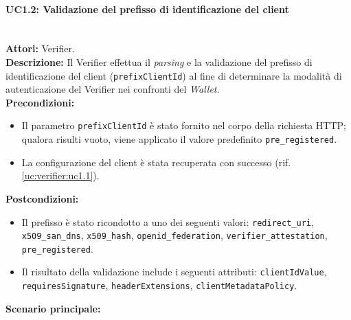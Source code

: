 \paragraph{\large\bfseries UC1.2: Validazione del prefisso di identificazione del client}
\label{uc:verifier:uc1.2}
\mbox{}\\
\noindent\textbf{Attori:} Verifier.
\\
\noindent\textbf{Descrizione:} Il Verifier effettua il \textit{parsing} e la validazione del prefisso di identificazione del client (\texttt{prefixClientId}) al fine di determinare la modalità di autenticazione del Verifier nei confronti del \textit{Wallet}.
\\
\noindent\textbf{Precondizioni:}
\begin{itemize}
    \item Il parametro \texttt{prefixClientId} è stato fornito nel corpo della richiesta HTTP; qualora risulti vuoto, viene applicato il valore predefinito \texttt{pre\_\allowbreak{}registered}.
    \item La configurazione del client è stata recuperata con successo (rif. \ref{uc:verifier:uc1.1}).
\end{itemize}
\noindent\textbf{Postcondizioni:}
\begin{itemize}
    \item Il prefisso è stato ricondotto a uno dei seguenti valori: \texttt{redirect\_\allowbreak{}uri}, \texttt{x509\_\allowbreak{}san\_\allowbreak{}dns}, \texttt{x509\_\allowbreak{}hash}, \texttt{openid\_\allowbreak{}federation}, \texttt{verifier\_\allowbreak{}attestation}, \texttt{pre\_\allowbreak{}registered}.
    \item Il risultato della validazione include i seguenti attributi: \texttt{clientIdValue}, \texttt{requiresSignature}, \texttt{headerExtensions}, \texttt{clientMetadataPolicy}.
\end{itemize}
\noindent\textbf{Scenario principale:}
